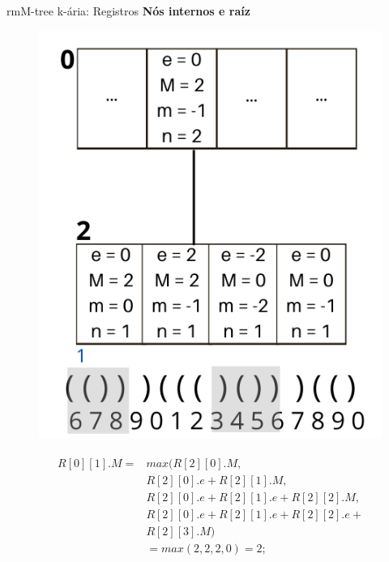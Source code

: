 \begin{frame}{rmM-tree k-ária: Registros}
    \textbf{Nós internos e raíz}
    \begin{figure}[h]
        \begin{minipage}[c]{0.25\linewidth}
            \includegraphics[scale=0.70]{images/k-internal-nodes.png}
        \end{minipage}
        \begin{minipage}[c]{0.70\linewidth}
                \begin{eqnarray*}
                    \begin{split}
                        R[0][1].M =& max(R[2][0].M, \\
                        &   R[2][0].e + R[2][1].M, \\
                        &   R[2][0].e + R[2][1].e + R[2][2].M,  \\
                        &   R[2][0].e + R[2][1].e + R[2][2].e  +\\
                        &   R[2][3].M)\\
                        &   = max(2,2,2,0) = 2;
                    \end{split}
                \end{eqnarray*}
        \end{minipage}
    \end{figure}
\end{frame}

